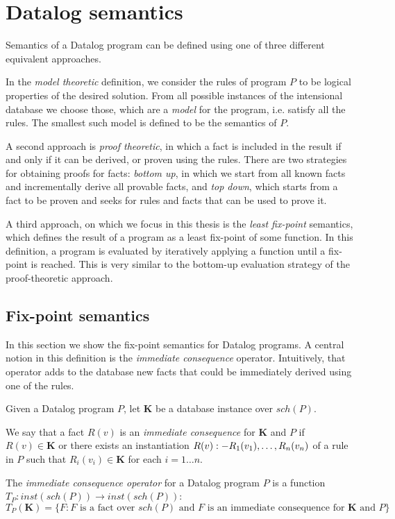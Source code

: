 \section{Datalog semantics}
Semantics of a Datalog program can be defined using one of three different equivalent approaches.

In the \emph{model theoretic} definition, we consider the rules of program $P$ to be logical properties of the desired solution. From all possible instances of the intensional database we choose those, which are a \emph{model} for the program, i.e. satisfy all the rules. The smallest such model is defined to be the semantics of $P$.

A second approach is \emph{proof theoretic}, in which a fact is included in the result if and only if it can be derived, or proven using the rules. There are two strategies for obtaining proofs for facts: \emph{bottom up}, in which we start from all known facts and incrementally derive all provable facts, and \emph{top down}, which starts from a fact to be proven and seeks for rules and facts that can be used to prove it.

A third approach, on which we focus in this thesis is the \emph{least fix-point} semantics, which defines the result of a program as a least fix-point of some function. In this definition, a program is evaluated by iteratively applying a function until a fix-point is reached. This is very similar to the bottom-up evaluation strategy of the proof-theoretic approach.

\subsection{Fix-point semantics}
In this section we show the fix-point semantics for Datalog programs. A central notion in this definition is the \emph{immediate consequence} operator. Intuitively, that operator adds to the database new facts that could be immediately derived using one of the rules.

Given a Datalog program $P$, let $\textbf{K}$ be a database instance over $sch(P)$.

We say that a fact $R(v)$ is an \emph{immediate consequence} for $\textbf{K}$ and $P$ if $R(v) \in \textbf{K}$ or there exists an instantiation $R(v) :- R_1(v_1), \dots, R_n(v_n)$ of a rule in $P$ such that $R_i(v_i) \in \textbf{K}$ for each $i = 1\dots n$.

The \emph{immediate consequence operator} for a Datalog program $P$ is a function $T_P: inst(sch(P)) \to inst(sch(P))$:
$$T_P(\textbf{K}) = \{ F: F \text{ is a fact over } sch(P) \text{ and $F$ is an immediate consequence for } \textbf{K} \text{ and } P \}$$

